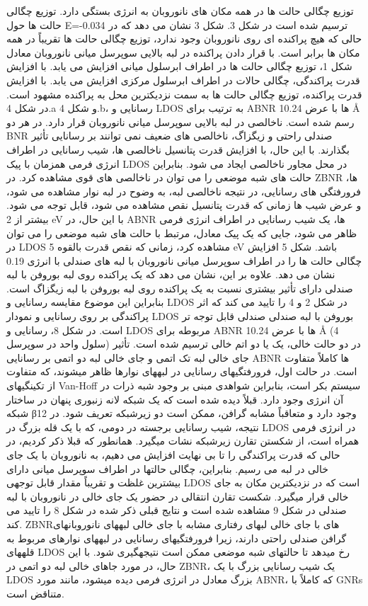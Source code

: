 توزیع چگالی حالت ها در همه مکان های نانوروبان به انرژی بستگی دارد. توزیع چگالی حالت ها حول E=-0.034 ترسیم شده است در شکل 3. شکل 3 نشان می دهد که در حالی که هیچ پراکنده ای روی نانوروبان وجود ندارد، توزیع چگالی حالت ها تقریباً در همه مکان ها برابر است. با قرار دادن پراکنده در لبه بالایی سوپرسل میانی نانوروبان معادل شکل 1، توزیع چگالی حالت ها در اطراف ابرسلول میانی افزایش می یابد. با افزایش قدرت پراکندگی، چگالی حالات در اطراف ابرسلول مرکزی افزایش می یابد. با افزایش قدرت پراکنده، توزیع چگالی حالت ها به سمت نزدیکترین محل به پراکنده مشهود است. در شکل 4.a و شکل 4.b، رسانایی و LDOS به ترتیب برای ABNR ها با عرض 10.24 Å رسم شده است. ناخالصی در لبه بالایی سوپرسل میانی نانوروبان قرار دارد. در هر دو BNR صندلی راحتی و زیگزاگ، ناخالصی های ضعیف نمی توانند بر رسانایی تأثیر بگذارند. با این حال، با افزایش قدرت پتانسیل ناخالصی ها، شیب رسانایی در اطراف انرژی فرمی همزمان با پیک LDOS در محل مجاور ناخالصی ایجاد می شود. بنابراین حالت های شبه موضعی را می توان در ناخالصی های قوی مشاهده کرد. در ZBNR ها، فرورفتگی های رسانایی، در نتیجه ناخالصی لبه، به وضوح در لبه نوار مشاهده می شود، و عرض شیب ها زمانی که قدرت پتانسیل نقص مشاهده می شود، قابل توجه می شود. بیشتر از 2 eV با این حال، در ABNR ها، یک شیب رسانایی در اطراف انرژی فرمی ظاهر می شود، جایی که یک پیک معادل، مرتبط با حالت های شبه موضعی را می توان در LDOS مشاهده کرد، زمانی که نقص قدرت بالقوه 5 eV باشد. شکل 5 افزایش چگالی حالت ها را در اطراف سوپرسل میانی نانوروبان با لبه های صندلی با انرژی 0.19 نشان می دهد. علاوه بر این، نشان می دهد که یک پراکنده روی لبه بوروفن با لبه صندلی دارای تأثیر بیشتری نسبت به یک پراکنده روی لبه بوروفن با لبه زیگزاگ است. بنابراین این موضوع مقایسه رسانایی و LDOS در شکل 2 و 4 را تایید می کند که اثر پراکندگی بر روی رسانایی و نمودار LDOS بوروفن با لبه صندلی صندلی قابل توجه تر است. در شکل 8، رسانایی و LDOS مربوطه برای ABNR ها با عرض 10.24 Å (4 سلول واحد در سوپرسل) در دو حالت خالی، یک یا دو اتم خالی ترسیم شده است. تأثیر جای خالی لبه تک اتمی و جای خالی لبه دو اتمی بر رسانایی ABNR ها کاملاً متفاوت است. در حالت اول، فرورفتگیهای رسانایی در لبههای نوارها ظاهر میشوند، که متفاوت از تکینگیهای Van-Hoff سیستم بکر است، بنابراین شواهدی مبنی بر وجود شبه ذرات در آن انرژی وجود دارد. قبلاً دیده شده است که یک شبکه لانه زنبوری پنهان در ساختار شبکه β12 وجود دارد و متعاقباً مشابه گرافن، ممکن است دو زیرشبکه تعریف شود. در نتیجه، شیب رسانایی برجسته در دومی، که با یک قله بزرگ در LDOS در انرژی فرمی همراه است، از شکستن تقارن زیرشبکه نشات میگیرد. همانطور که قبلا ذکر کردیم، در حالی که قدرت پراکندگی را تا بی نهایت افزایش می دهیم، به نانوروبان با یک جای خالی در لبه می رسیم. بنابراین، چگالی حالتها در اطراف سوپرسل میانی دارای بیشترین غلظت و تقریباً مقدار قابل توجهی LDOS است که در نزدیکترین مکان به جای خالی قرار میگیرد. شکست تقارن انتقالی در حضور یک جای خالی در نانوروبان با لبه صندلی در شکل 9 مشاهده شده است و نتایج قبلی ذکر شده در شکل 8 را تایید می کند. ZBNRهای با جای خالی لبهای رفتاری مشابه با جای خالی لبههای نانوروبانهای گرافن صندلی راحتی دارند، زیرا فرورفتگیهای رسانایی در لبههای نوارهای مربوط به قلههای LDOS رخ میدهد تا حالتهای شبه موضعی ممکن است نتیجهگیری شود. با این حال، در مورد جاهای خالی لبه دو اتمی در ZBNR، یک شیب رسانایی بزرگ با یک LDOS بزرگ معادل در انرژی فرمی دیده میشود، مانند مورد ABNR، که کاملاً با GNRs متناقض است.

